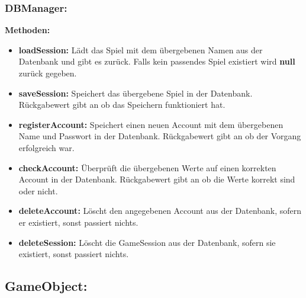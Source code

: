 \documentclass[fontsize=12pt,paper=a4,twoside]{scrartcl}
\begin{document}
\subsubsection{DBManager:}
\textbf{Methoden:}
\begin{itemize}
	\item \textbf{loadSession:} Lädt das Spiel mit dem übergebenen Namen aus der Datenbank und gibt es zurück. Falls kein passendes Spiel existiert wird \textbf{null} zurück gegeben.
	\item \textbf{saveSession:} Speichert das übergebene Spiel in der Datenbank. Rückgabewert gibt an ob das Speichern funktioniert hat.
	\item \textbf{registerAccount:} Speichert einen neuen Account mit dem übergebenen Name und Passwort in der Datenbank. Rückgabewert gibt an ob der Vorgang erfolgreich war.
	\item \textbf{checkAccount:} Überprüft die übergebenen Werte auf einen korrekten Account in der Datenbank. Rückgabewert gibt an ob die Werte korrekt sind oder nicht.
	\item \textbf{deleteAccount:} Löscht den angegebenen Account aus der Datenbank, sofern er existiert, sonst passiert nichts.
	\item \textbf{deleteSession:} Löscht die GameSession aus der Datenbank, sofern sie existiert, sonst passiert nichts.
\end{itemize}


\subsection{GameObject:}
\end{document}
